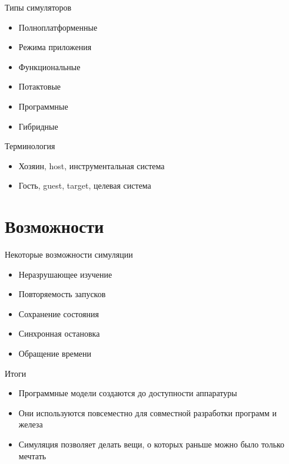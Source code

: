 \documentclass{beamer}
\begin{document}
\begin{frame}{Типы симуляторов}
\begin{itemize}
\item Полноплатформенные
\item Режима приложения
\item Функциональные
\item Потактовые
\item Программные
\item Гибридные
\end{itemize}
\end{frame}

\begin{frame}{Терминология}
\begin{itemize}
\item Хозяин, host, инструментальная система
\item Гость, guest, target, целевая система
\end{itemize}
\end{frame}

\section{Возможности}

\begin{frame}{Некоторые возможности симуляции}
\begin{itemize}
\item Неразрушающее изучение
\item Повторяемость запусков
\item Сохранение состояния
\item Синхронная остановка
\item Обращение времени
\end{itemize}
\end{frame}

\begin{frame}{Итоги}
\begin{itemize}
\item Программные модели создаются до доступности аппаратуры
\item Они используются повсеместно для совместной разработки программ и железа
\item Симуляция позволяет делать вещи, о которых раньше можно было только мечтать
\end{itemize}
\end{frame}
\end{document}
